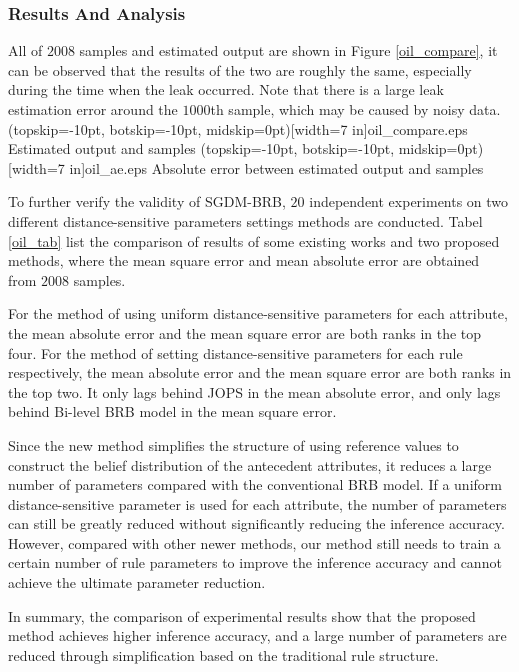 \documentclass{ieeeaccess}
\begin{document}
\subsubsection{Results And Analysis}
All of $2008$ samples and estimated output are shown in Figure \ref{oil_compare}, it can be observed that the results of the two are roughly the same,
especially during the time when the leak occurred.
Note that there is a large leak estimation error around the $1000$th sample,
which may be caused by noisy data.
\Figure[!t](topskip=-10pt, botskip=-10pt, midskip=0pt)[width=7 in]{oil_compare.eps}
{Estimated output and samples\label{oil_compare}}
\Figure[!t](topskip=-10pt, botskip=-10pt, midskip=0pt)[width=7 in]{oil_ae.eps}
{Absolute error between estimated output and samples\label{oil_ae}}


To further verify the validity of SGDM-BRB, $20$ independent experiments on two different distance-sensitive parameters settings methods are conducted.
Tabel \ref{oil_tab} list the comparison of results of some existing works and two proposed methods,
where the mean square error and mean absolute error are obtained from $2008$ samples.

For the method of using uniform distance-sensitive parameters for each attribute, the mean absolute error and the mean square error are both ranks in the top four.
For the method of setting distance-sensitive parameters for each rule respectively, the mean absolute error and the mean square error are both ranks in the top two.
It only lags behind JOPS in the mean absolute error, and only lags behind Bi-level BRB model in the mean square error.

Since the new method simplifies the structure of using reference values to construct the belief distribution of the antecedent attributes,
it reduces a large number of parameters compared with the conventional BRB model.
If a uniform distance-sensitive parameter is used for each attribute,
the number of parameters can still be greatly reduced without significantly reducing the inference accuracy.
However, compared with other newer methods, our method still needs to train a certain number of rule parameters to improve the inference accuracy and cannot achieve the ultimate parameter reduction.

In summary, the comparison of experimental results show that the proposed method  achieves higher inference accuracy,
and a large number of parameters are reduced through simplification based on the traditional rule structure.
\end{document}

